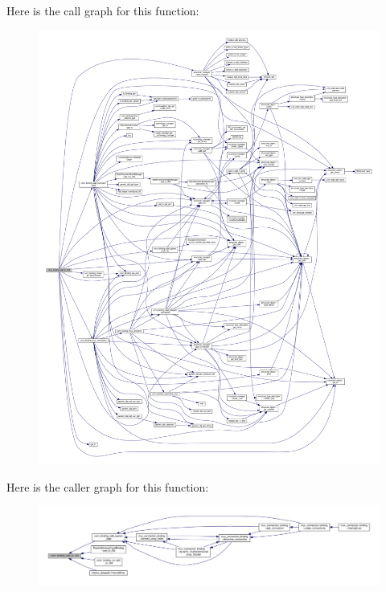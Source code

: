 Here is the call graph for this function\+:
\nopagebreak
\begin{figure}[H]
\begin{center}
\leavevmode
\includegraphics[width=350pt]{d2/db1/classconn__binding_aaf898285e246aa69fd49c271cfb8b0bc_cgraph}
\end{center}
\end{figure}
Here is the caller graph for this function\+:
\nopagebreak
\begin{figure}[H]
\begin{center}
\leavevmode
\includegraphics[width=350pt]{d2/db1/classconn__binding_aaf898285e246aa69fd49c271cfb8b0bc_icgraph}
\end{center}
\end{figure}
\mbox{\label{classconn__binding_ac7b383c69e3484e71b5f4d474af6c2f4}} 
